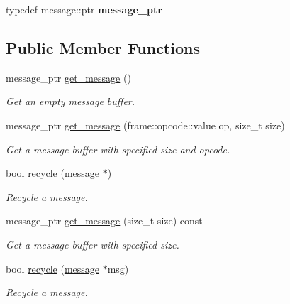 \begin{DoxyCompactItemize}
\item 
typedef message\+::ptr {\bfseries message\+\_\+ptr}\hypertarget{classwebsocketpp_1_1message__buffer_1_1alloc_1_1con__msg__manager_a2b7d97fc21ff99e307ec20fe0369f294}{}\label{classwebsocketpp_1_1message__buffer_1_1alloc_1_1con__msg__manager_a2b7d97fc21ff99e307ec20fe0369f294}

\end{DoxyCompactItemize}
\subsection*{Public Member Functions}
\begin{DoxyCompactItemize}
\item 
message\+\_\+ptr \hyperlink{classwebsocketpp_1_1message__buffer_1_1alloc_1_1con__msg__manager_ab37990d12c3d54f6963df6b0ddadcf28}{get\+\_\+message} ()
\begin{DoxyCompactList}\small\item\em Get an empty message buffer. \end{DoxyCompactList}\item 
message\+\_\+ptr \hyperlink{classwebsocketpp_1_1message__buffer_1_1alloc_1_1con__msg__manager_ab2163fa7f202ebcbad8e77a6b63d8f17}{get\+\_\+message} (frame\+::opcode\+::value op, size\+\_\+t size)
\begin{DoxyCompactList}\small\item\em Get a message buffer with specified size and opcode. \end{DoxyCompactList}\item 
bool \hyperlink{classwebsocketpp_1_1message__buffer_1_1alloc_1_1con__msg__manager_a6373a7891e108a232a2a62a5696295e8}{recycle} (\hyperlink{classwebsocketpp_1_1message__buffer_1_1message}{message} $\ast$)
\begin{DoxyCompactList}\small\item\em Recycle a message. \end{DoxyCompactList}\item 
message\+\_\+ptr \hyperlink{classwebsocketpp_1_1message__buffer_1_1alloc_1_1con__msg__manager_a1d7e3db20ccfebb6f5e73fb12fce007c}{get\+\_\+message} (size\+\_\+t size) const
\begin{DoxyCompactList}\small\item\em Get a message buffer with specified size. \end{DoxyCompactList}\item 
bool \hyperlink{classwebsocketpp_1_1message__buffer_1_1alloc_1_1con__msg__manager_a4e1013bc89944fbfd222b9ab6ad76712}{recycle} (\hyperlink{classwebsocketpp_1_1message__buffer_1_1message}{message} $\ast$msg)
\begin{DoxyCompactList}\small\item\em Recycle a message. \end{DoxyCompactList}\end{DoxyCompactItemize}


